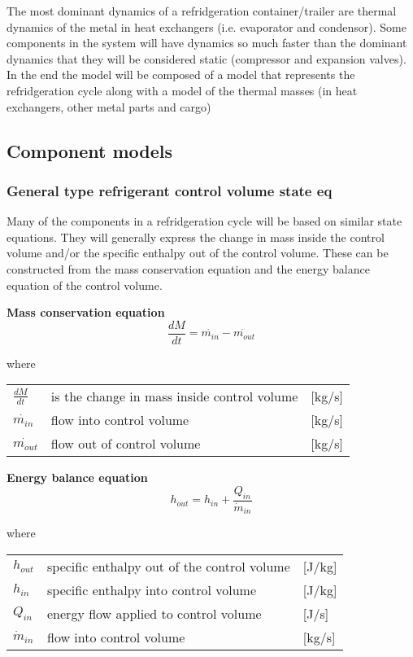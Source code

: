 The most dominant dynamics of a refridgeration container/trailer are thermal dynamics of the metal in heat exchangers (i.e. evaporator and condensor). Some components in the system will have dynamics so much faster than the dominant dynamics that they will be considered static (compressor and expansion valves).
In the end the model will be composed of a model that represents the refridgeration cycle along with a model of the thermal masses (in heat exchangers, other metal parts and cargo)


\subsection{Component models}

\subsubsection{General type refrigerant control volume state eq}
Many of the components in a refridgeration cycle will be based on similar state equations. They will generally express the change in mass inside the control volume and/or the specific enthalpy out of the control volume. These can be constructed from the mass conservation equation and the energy balance equation of the control volume.

\textbf{Mass conservation equation} \\
\begin{equation} \label{eq:GeneralTypeControlVol_MassConservation}
	\frac{dM}{dt} = \dot{m_{in}} - \dot{m_{out}}
\end{equation}

where 
\begin{center}
	\begin{tabular}{l p{8cm} l}
		$\frac{dM}{dt}$ & is the change in mass inside control volume & [\si{kg}/\si{s}]\\ 
		$\dot{m_{in}}$ & flow into control volume & [\si{kg}/\si{s}]\\
		$\dot{m_{out}}$ & flow out of control volume & [\si{kg}/\si{s}]\\
	\end{tabular}
\end{center}

\textbf{Energy balance equation}
\begin{equation}
	h_{out} = h_{in} + \frac{Q_{in}}{\dot{m}_{in}}
\end{equation}

where
\begin{center}
	\begin{tabular}{l p{8cm} l}
		$h_{out}$ & specific enthalpy out of the control volume & [\si{J}/\si{kg}]\\ 
		$h_{in}$ & specific enthalpy into control volume & [\si{J}/\si{kg}]\\ 
		$Q_{in}$ & energy flow applied to control volume& [\si{J}/\si{s}]\\
		$\dot{m}_{in}$ & flow into control volume & [\si{kg}/\si{s}]\\
	\end{tabular}
\end{center}

